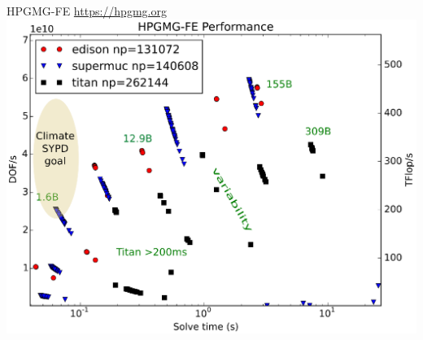 \begin{frame}{HPGMG-FE \quad \url{https://hpgmg.org}}
  \centering \includegraphics[width=.9\textwidth]{figures/hpgmg/range-edison-supermuc-titan-ann2}
\end{frame}
